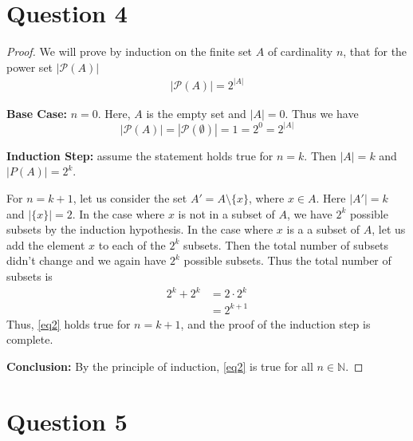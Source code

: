 \documentclass[11pt, oneside]{article}   	%
\begin{document}
\section*{Question 4}

\begin{proof} We will prove by induction on the finite set $A$ of cardinality $n$, that for the power set $|\mathcal{P}(A)|$
\begin{align}
	|\mathcal{P}(A)| = 2^{|A|}
\label{eq2}
\end{align}

\textbf{Base Case:} $n=0$. Here, $A$ is the empty set and $|A|=0$. Thus we have
$$|\mathcal{P}(A)| = |\mathcal{P}(\emptyset)| = 1 = 2^{0} = 2^{|A|}$$

\textbf{Induction Step:} assume the statement holds true for $n=k$. Then $|A|=k$ and $|P(A)| = 2^k$.

For $n=k+1$, let us consider the set $A' = A \setminus \{x\}$, where $x \in A$. Here $|A'| = k$ and $|\{x\}|=2$. In the case where $x$ is not in a subset of $A$, we have $2^k$ possible subsets by the induction hypothesis. In the case where $x$ is a a subset of $A$, let us add the element $x$ to each of the $2^k$ subsets. Then the total number of subsets didn't change and we again have $2^k$ possible subsets. Thus the total number of subsets is
\begin{align*}
	2^k + 2^k & = 2 \cdot 2^k \\
	& = 2^{k+1}
\end{align*}
Thus, \eqref{eq2} holds true for $n=k+1$, and the proof of the induction step is complete.

\textbf{Conclusion:} By the principle of induction, \eqref{eq2} is true for all $n \in \mathbb{N}$.
\end{proof}


\section*{Question 5}
\end{document}
